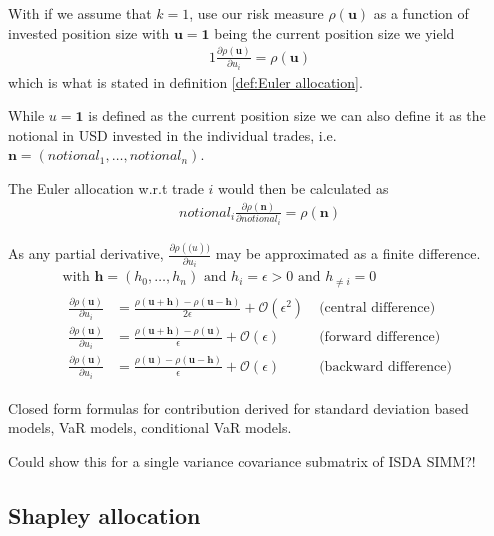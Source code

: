 \documentclass[../Thesis_AHoecherl.tex]{subfiles}
\begin{document}
With if we assume that $k=1$, use our risk measure $\rho(\mathbf{u})$ as a function of invested position size with $\mathbf{u} = \mathbf{1}$ being the current position size we yield
\begin{align}
    1\frac{\partial \rho(\mathbf{u})}{\partial u_i} = \rho(\mathbf{u})
\end{align}
which is what is stated in definition \ref{def:Euler allocation}.

While $u = \mathbf{1}$ is defined as the current position size we can also define it as the notional in USD invested in the individual trades, i.e. $\mathbf{n} = (notional_1, \dots, notional_n)$.

The Euler allocation w.r.t trade $i$ would then be calculated as
\begin{align}
    notional_i\frac{\partial \rho(\mathbf{n})}{\partial notional_i} = \rho(\mathbf{n})
\end{align}


As any partial derivative, $\frac{\partial \rho(\mathbf(u))}{\partial u_i}$ may be approximated as a finite difference.
\begin{gather*}
    \text{with }\mathbf{h}=(h_0,\dots,h_n) \text{ and } h_i = \epsilon > 0 \text{ and } h_{\neq i}=0 \\
    \begin{align}
        \frac{\partial \rho(\mathbf{u})}{\partial u_i} &= \frac{\rho(\mathbf{u}+\mathbf{h})-\rho(\mathbf{u}-\mathbf{h})}{2\epsilon} + \mathcal{O}(\epsilon^2) \; &\text{(central difference)} \\
        \frac{\partial \rho(\mathbf{u})}{\partial u_i} &= \frac{\rho(\mathbf{u}+\mathbf{h})-\rho(\mathbf{u})}{\epsilon} + \mathcal{O}(\epsilon) &\text{(forward difference)}\\
        \frac{\partial \rho(\mathbf{u})}{\partial u_i} &= \frac{\rho(\mathbf{u})-\rho(\mathbf{u}-\mathbf{h})}{\epsilon} + \mathcal{O}(\epsilon) &\text{(backward difference)}
    \end{align}
\end{gather*}


Closed form formulas for contribution derived for standard deviation based models, VaR models, conditional VaR models.

Could show this for a single variance covariance submatrix of ISDA SIMM?!

\subsection{Shapley allocation}

\end{document}
